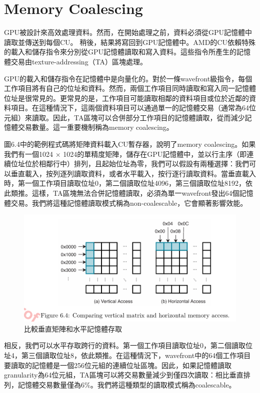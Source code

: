 \section{Memory Coalescing} \label{sec:memory_coalescing}
GPU被設計來高效處理資料。然而，在開始處理之前，資料必須從GPU記憶體中讀取並傳送到每個CU。
稍後，結果將寫回到GPU記憶體中。AMD的CU依賴特殊的載入和儲存指令來分別從GPU記憶體讀取和寫入資料。這些指令所產生的記憶體交易由texture-addressing（TA）區塊處理。

\vspace{1em}
GPU的載入和儲存指令在記憶體中是向量化的。對於一條wavefront級指令，每個工作項目將有自己的位址和資料。然而，兩個工作項目同時讀取和寫入同一記憶體位址是很常見的。更常見的是，工作項目可能讀取相鄰的資料項目或位於近鄰的資料項目。在這種情況下，這兩個資料項目可以通過單一的記憶體交易（通常為64位元組）來讀取。因此，TA區塊可以合併部分工作項目的記憶體讀取，從而減少記憶體交易數量。這一重要機制稱為memory coalescing。

\vspace{1em}
圖6.4中的範例程式碼將矩陣資料載入CU暫存器，說明了memory coalescing。如果我們有一個1024 × 1024的單精度矩陣，儲存在GPU記憶體中，並以行主序（即連續位址位於相鄰行中）排列，且起始位址為零，我們可以假設有兩種選擇：我們可以垂直載入，按列逐列讀取資料，或者水平載入，按行逐行讀取資料。當垂直載入時，第一個工作項目讀取位址0，第二個讀取位址4096，第三個讀取位址8192，依此類推。這樣，TA區塊無法合併記憶體讀取，必須為單一wavefront發出64個記憶體交易。我們將這種記憶體讀取模式稱為non-coalescable，它會顯著影響效能。

\begin{figure}
    \centering
    \includegraphics[width=1\linewidth]{FileAusiliari//Screenshots/Figure6-4.png}
    \caption{比較垂直矩陣和水平記憶體存取}
    \label{fig:enter-label}
\end{figure}

\vspace{1em}
相反，我們可以水平存取跨行的資料。第一個工作項目讀取位址0，第二個讀取位址4，第三個讀取位址8，依此類推。在這種情況下，wavefront中的64個工作項目要讀取的記憶體是一個256位元組的連續位址區塊。因此，如果記憶體讀取granularity為64位元組，TA區塊可以將交易數量減少到僅四次讀取：相比垂直排列，記憶體交易數量僅為6\%。我們將這種類型的讀取模式稱為coalescable。

